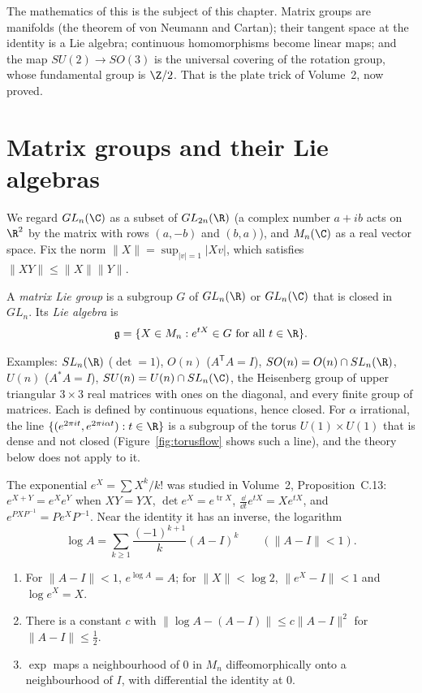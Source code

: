 The mathematics of this is the subject of this chapter. Matrix groups are manifolds (the theorem of von Neumann and Cartan); their tangent
space at the identity is a Lie algebra; continuous homomorphisms become linear maps; and the map $SU(2)\to SO(3)$ is the universal covering of the rotation
group, whose fundamental group is $\Z/2$. That is the plate trick of Volume~2, now proved.

\section{Matrix groups and their Lie algebras}

We regard $GL_n(\C)$ as a subset of $GL_{2n}(\R)$ (a complex number $a+ib$ acts on $\R^2$ by the matrix with rows $(a,-b)$ and $(b,a)$), and
$M_n(\C)$ as a real vector space. Fix the norm $\|X\|=\sup_{|v|=1}|Xv|$, which satisfies $\|XY\|\le\|X\|\|Y\|$.

\begin{definition}
A \emph{matrix Lie group} is a subgroup $G$ of $GL_n(\R)$ or $GL_n(\C)$ that is closed in $GL_n$. Its \emph{Lie algebra} is
\[\mathfrak g=\{X\in M_n:e^{tX}\in G\text{ for all }t\in\R\}.\]
\end{definition}

Examples: $SL_n(\R)$ ($\det=1$), $O(n)$ ($A^{\mathsf T}A=I$), $SO(n)=O(n)\cap SL_n(\R)$, $U(n)$ ($A^*A=I$), $SU(n)=U(n)\cap SL_n(\C)$, the Heisenberg group of upper triangular $3\times3$ real matrices with ones
on the diagonal, and every finite group of matrices. Each is defined by continuous equations, hence closed. For $\alpha$ irrational, the line $\{(e^{2\pi it},e^{2\pi i\alpha t}):t\in\R\}$ is a subgroup of the torus $U(1)\times U(1)$
that is dense and not closed (Figure~\ref{fig:torusflow} shows such a line), and the theory below does not apply to it.

The exponential $e^X=\sum X^k/k!$ was studied in Volume~2, Proposition~C.13: $e^{X+Y}=e^Xe^Y$ when $XY=YX$, $\det e^X=e^{\operatorname{tr}X}$, $\frac{\dd}{\dd t}e^{tX}=Xe^{tX}$, and $e^{PXP^{-1}}=Pe^XP^{-1}$.
Near the identity it has an inverse, the logarithm
\[\log A=\sum_{k\ge1}\frac{(-1)^{k+1}}k(A-I)^k\qquad(\|A-I\|<1).\]

\begin{lemma}\label{lem:log}
\begin{enumerate}
\item[(a)] For $\|A-I\|<1$, $e^{\log A}=A$; for $\|X\|<\log2$, $\|e^X-I\|<1$ and $\log e^X=X$.
\item[(b)] There is a constant $c$ with $\|\log A-(A-I)\|\le c\|A-I\|^2$ for $\|A-I\|\le\frac12$.
\item[(c)] $\exp$ maps a neighbourhood of $0$ in $M_n$ diffeomorphically onto a neighbourhood of $I$, with differential the identity at $0$.
\end{enumerate}
\end{lemma}

